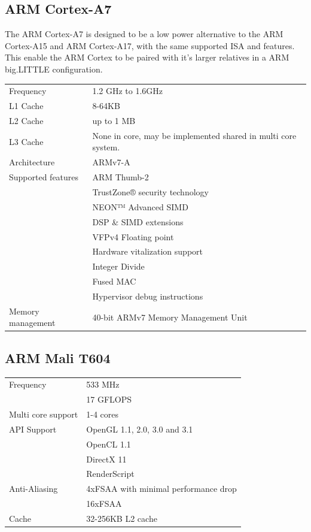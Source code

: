 \subsection{ARM Cortex-A7}
The ARM Cortex-A7 is designed to be a low power alternative to the ARM Cortex-A15 and ARM Cortex-A17, with the same supported ISA and features.
This enable the ARM Cortex to be paired with it's larger relatives in a ARM big.LITTLE configuration.
\begin{table}[H]
  \begin{tabular}{ll}
    Frequency         & 1.2 GHz to 1.6GHz  \\
    L1 Cache          & 8-64KB \\
    L2 Cache          & up to 1 MB \\
    L3 Cache          & None in core, may be implemented shared in multi core system. \\
    Architecture      & ARMv7-A            \\
    Supported features& ARM Thumb-2 \\
                      & TrustZone® security technology \\
                      & NEON™ Advanced SIMD \\
                      & DSP \& SIMD extensions \\
                      & VFPv4 Floating point \\
                      & Hardware vitalization support \\
                      & Integer Divide \\
                      & Fused MAC \\
                      & Hypervisor debug instructions \\
    Memory management & 40-bit ARMv7 Memory Management Unit
  \end{tabular}
\end{table}
\subsection{ARM Mali T604}
\begin{table}[H]
  \begin{tabular}{ll}
    Frequency         & 533 MHz\\
                      & 17 GFLOPS  \\
    Multi core support & 1-4 cores  \\
    API Support       & OpenGL 1.1, 2.0, 3.0 and 3.1  \\
                      & OpenCL 1.1  \\
                      & DirectX 11  \\
                      & RenderScript \\
    Anti-Aliasing     & 4xFSAA with minimal performance drop  \\
                      & 16xFSAA  \\
    Cache             & 32-256KB L2 cache
  \end{tabular}
\end{table}
